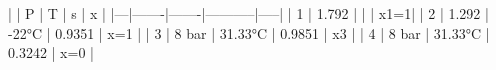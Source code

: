 |   |   P   |   T   |     s     |  x  |
|---|-------|-------|-----------|-----|
| 1 | 1.792 |       |           | x1=1|
| 2 | 1.292 | -22°C | 0.9351    | x=1 |
| 3 | 8 bar | 31.33°C | 0.9851 | x3   |
| 4 | 8 bar | 31.33°C | 0.3242 | x=0  |